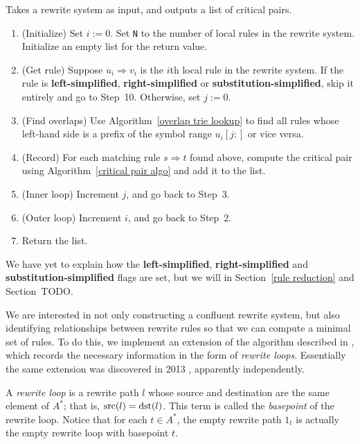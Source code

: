 \documentclass[../generics]{subfiles}
\begin{document}
\begin{algorithm}\label{find overlapping rule algo}
Takes a rewrite system as input, and outputs a list of critical pairs.
\begin{enumerate}
\item (Initialize) Set $i:=0$. Set \texttt{N} to the number of local rules in the rewrite system. Initialize an empty list for the return value.
\item (Get rule) Suppose $u_i\Rightarrow v_i$ is the $i$th local rule in the rewrite system. If the rule is \textbf{left-simplified}, \textbf{right-simplified} or \textbf{substitution-simplified}, skip it entirely and go to Step~10. Otherwise, set $j:=0$.
\item (Find overlaps) Use Algorithm~\ref{overlap trie lookup} to find all rules whose left-hand side is a prefix of the symbol range $u_i[j:]$ or vice versa.
\item (Record) For each matching rule $s\Rightarrow t$ found above, compute the critical pair using Algorithm~\ref{critical pair algo} and add it to the list.
\item (Inner loop) Increment $j$, and go back to Step~3.
\item (Outer loop) Increment $i$, and go back to Step~2.
\item Return the list.
\end{enumerate}
\end{algorithm}

We have yet to explain how the \textbf{left-simplified}, \textbf{right-simplified} and \textbf{substitution-simplified} flags are set, but we will in Section~\ref{rule reduction} and Section~TODO.

We are interested in not only constructing a confluent rewrite system, but also identifying relationships between rewrite rules so that we can compute a minimal set of rules. To do this, we implement an extension of the algorithm described in \cite{loggedrewriting}, which records the necessary information in the form of \emph{rewrite loops}. Essentially the same extension was discovered in 2013 \cite{homotopicalcompletion}, apparently independently.
\begin{definition}
A \emph{rewrite loop} is a rewrite path $l$ whose source and destination are the same element of $A^*$; that is, $\operatorname{src}(l)=\operatorname{dst}(l)$. This term is called the \emph{basepoint} of the rewrite loop. Notice that for each $t\in A^*$, the empty rewrite path $1_t$ is actually the empty rewrite loop with basepoint $t$.
\end{definition}
\end{document}
